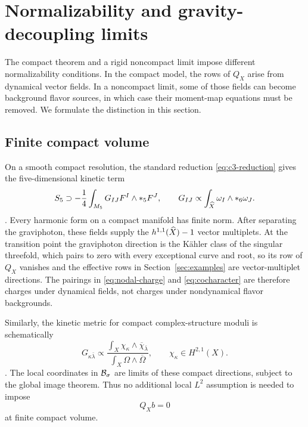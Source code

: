 \section{Normalizability and gravity-decoupling limits}
\label{sec:decoupling}

The compact theorem and a rigid noncompact limit impose different
normalizability conditions. In the compact model, the rows of $Q_X$ arise from
dynamical vector fields. In a noncompact limit, some of those fields can
become background flavor sources, in which case their moment-map equations
must be removed. We formulate the distinction in this section.

\subsection{Finite compact volume}
\label{subsec:compact-normalizability}

On a smooth compact resolution, the standard reduction
\eqref{eq:c3-reduction} gives the five-dimensional kinetic term
\begin{equation}
 S_5\supset-\frac14\int_{M_5}G_{IJ}F^I\wedge *_5F^J,
 \qquad
 G_{IJ}\propto\int_{\widehat X}\omega_I\wedge *_6\omega_J.
 \label{eq:vector-kinetic-matrix}
\end{equation}
\cite{Cadavid:1995bk}.
Every harmonic form on a compact manifold has finite norm. After separating
the graviphoton, these fields supply the $h^{1,1}(\widehat X)-1$ vector
multiplets. At the transition point the graviphoton direction is the
K\"ahler class of the singular threefold, which pairs to zero with every
exceptional curve and root, so its row of $Q_X$ vanishes and the effective
rows in Section~\ref{sec:examples} are vector-multiplet directions. The
pairings in \eqref{eq:nodal-charge} and
\eqref{eq:cocharacter} are therefore charges under dynamical fields, not
charges under nondynamical flavor backgrounds.

Similarly, the kinetic metric for compact complex-structure moduli is
schematically
\begin{equation}
 G_{\kappa\bar\lambda}
 \propto
 \frac{\int_X\chi_\kappa\wedge\overline\chi_{\bar\lambda}}
      {\int_X\Omega\wedge\overline\Omega},
 \qquad
 \chi_\kappa\in H^{2,1}(X).
 \label{eq:complex-structure-metric}
\end{equation}
\cite{Cadavid:1995bk}.
The local coordinates in $\mathcal B_\sigma$ are limits of these compact directions,
subject to the global image theorem. Thus no additional local $L^2$
assumption is needed to impose
\begin{equation}
 Q_Xb=0
 \label{eq:full-compact-constraint}
\end{equation}
at finite compact volume.

